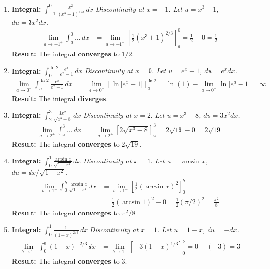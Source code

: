 \documentclass[12pt]{article}
\begin{document}
\begin{enumerate}
    \item \textbf{Integral: } $\displaystyle \int_{-1}^{0} \frac{x^2}{(x^3+1)^{1/3}} \,dx$
    \textit{Discontinuity at $x=-1$. Let $u=x^3+1$, $du=3x^2 dx$.}
    \begin{align*}
        \lim_{a \to -1^+} \int_{a}^{0} \dots \,dx &= \lim_{a \to -1^+} \left[\frac{1}{2}(x^3+1)^{2/3}\right]_a^0 = \frac{1}{2} - 0 = \frac{1}{2}
    \end{align*}
    \textbf{Result:} The integral \textbf{converges} to $1/2$.

    \item \textbf{Integral: } $\displaystyle \int_{0}^{\ln 2} \frac{e^x}{e^x-1} \,dx$
    \textit{Discontinuity at $x=0$. Let $u=e^x-1$, $du=e^x dx$.}
    \begin{align*}
        \lim_{a \to 0^+} \int_{a}^{\ln 2} \frac{e^x}{e^x-1} \,dx &= \lim_{a \to 0^+} [\ln|e^x-1|]_a^{\ln 2} = \ln(1) - \lim_{a \to 0^+} \ln|e^a-1| = \infty
    \end{align*}
    \textbf{Result:} The integral \textbf{diverges}.

    \item \textbf{Integral: } $\displaystyle \int_{2}^{3} \frac{3x^2}{\sqrt{x^3-8}} \,dx$
    \textit{Discontinuity at $x=2$. Let $u=x^3-8$, $du=3x^2 dx$.}
    \begin{align*}
        \lim_{a \to 2^+} \int_{a}^{3} \dots \,dx &= \lim_{a \to 2^+} [2\sqrt{x^3-8}]_a^3 = 2\sqrt{19} - 0 = 2\sqrt{19}
    \end{align*}
    \textbf{Result:} The integral \textbf{converges} to $2\sqrt{19}$.

    \item \textbf{Integral: } $\displaystyle \int_{0}^{1} \frac{\arcsin x}{\sqrt{1-x^2}} \,dx$
    \textit{Discontinuity at $x=1$. Let $u=\arcsin x$, $du = dx/\sqrt{1-x^2}$.}
    \begin{align*}
        \lim_{b \to 1^-} \int_0^b \frac{\arcsin x}{\sqrt{1-x^2}} \,dx &= \lim_{b \to 1^-} [\frac{1}{2}(\arcsin x)^2]_0^b \\
        &= \frac{1}{2}(\arcsin 1)^2 - 0 = \frac{1}{2}(\pi/2)^2 = \frac{\pi^2}{8}
    \end{align*}
    \textbf{Result:} The integral \textbf{converges} to $\pi^2/8$.

    \item \textbf{Integral: } $\displaystyle \int_{0}^{1} \frac{1}{(1-x)^{2/3}} \,dx$
    \textit{Discontinuity at $x=1$. Let $u=1-x$, $du=-dx$.}
    \begin{align*}
        \lim_{b \to 1^-} \int_{0}^{b} (1-x)^{-2/3} \,dx &= \lim_{b \to 1^-} [-3(1-x)^{1/3}]_0^b = 0 - (-3) = 3
    \end{align*}
    \textbf{Result:} The integral \textbf{converges} to $3$.
\end{enumerate}
\end{document}

